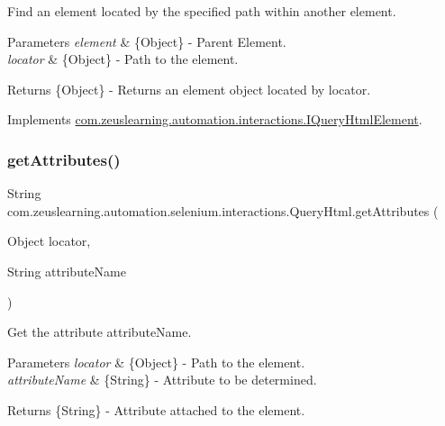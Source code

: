 Find an element located by the specified path within another element.


\begin{DoxyParams}{Parameters}
{\em element} & \{Object\} -\/ Parent Element.\\
\hline
{\em locator} & \{Object\} -\/ Path to the element. \\
\hline
\end{DoxyParams}
\begin{DoxyReturn}{Returns}
\{Object\} -\/ Returns an element object located by {\ttfamily locator}. 
\end{DoxyReturn}


Implements \hyperlink{interfacecom_1_1zeuslearning_1_1automation_1_1interactions_1_1IQueryHtmlElement_aa851cf42225ccecd3055ee8b2b2efe05}{com.\+zeuslearning.\+automation.\+interactions.\+I\+Query\+Html\+Element}.

\hypertarget{classcom_1_1zeuslearning_1_1automation_1_1selenium_1_1interactions_1_1QueryHtml_adfec4c777e003455fdc2a512d4a00959}{}\label{classcom_1_1zeuslearning_1_1automation_1_1selenium_1_1interactions_1_1QueryHtml_adfec4c777e003455fdc2a512d4a00959} 
\subsubsection{\texorpdfstring{get\+Attributes()}{getAttributes()}}
{\footnotesize\ttfamily String com.\+zeuslearning.\+automation.\+selenium.\+interactions.\+Query\+Html.\+get\+Attributes (\begin{DoxyParamCaption}\item[{Object}]{locator,  }\item[{String}]{attribute\+Name }\end{DoxyParamCaption})\hspace{0.3cm}{\ttfamily [inline]}}

Get the attribute {\ttfamily attribute\+Name}.


\begin{DoxyParams}{Parameters}
{\em locator} & \{Object\} -\/ Path to the element. \\
\hline
{\em attribute\+Name} & \{String\} -\/ Attribute to be determined.\\
\hline
\end{DoxyParams}
\begin{DoxyReturn}{Returns}
\{String\} -\/ Attribute attached to the element. 
\end{DoxyReturn}


